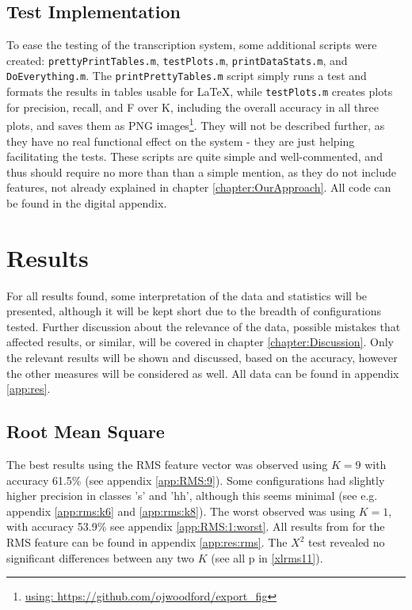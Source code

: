 	\subsection{Test Implementation}		%
		To ease the testing of the transcription system, some additional scripts were created: \texttt{prettyPrintTables.m}, \texttt{testPlots.m}, \texttt{printDataStats.m}, and \texttt{DoEverything.m}.
		The \texttt{printPrettyTables.m} script simply runs a test and formats the results in tables usable for \LaTeX, while \texttt{testPlots.m} creates plots for precision, recall, and F over K, including the overall accuracy in all three plots, and saves them as PNG images\footnote{\url{using: https://github.com/ojwoodford/export\_fig}}. They will not be described further, as they have no real functional effect on the system -  they are just helping facilitating the tests. These scripts are quite simple and well-commented, and thus should require no more than than a simple mention, as they do not include features, not already explained in chapter \ref{chapter:OurApproach}.
		All code can be found in the digital appendix.
			
 
\section{Results}
	
	For all results found, some interpretation of the data and statistics will be presented, although it will be kept short due to the breadth of configurations tested. Further discussion about the relevance of the data, possible mistakes that affected results, or similar, will be covered in chapter \ref{chapter:Discussion}. Only the relevant results will be shown and discussed, based on the accuracy, however the other measures will be considered as well. All data can be found in appendix \ref{app:res}. 

	
	\subsection{Root Mean Square}

	
		The best results using the RMS feature vector was observed using $K=9$ with accuracy 61.5\% (see appendix \ref{app:RMS:9}). Some configurations had slightly higher precision in classes 's' and 'hh', although this seems minimal (see e.g. appendix  \ref{app:rms:k6} and \ref{app:rms:k8}). The worst observed was using $K=1$, with accuracy 53.9\% see appendix \ref{app:RMS:1:worst}. All results from for the RMS feature can be found in appendix \ref{app:res:rms}. The $X^2$ test revealed no significant differences between any two $K$ (see all p in \ref{xlrms11}).

